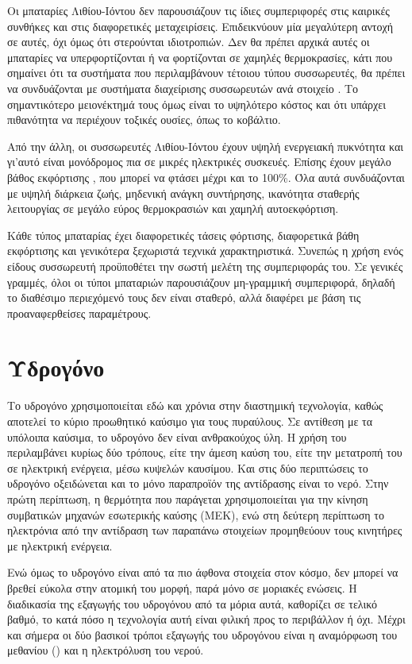 \documentclass[12pt]{report}
\begin{document}
Οι μπαταρίες Λιθίου-Ιόντου δεν παρουσιάζουν τις ίδιες συμπεριφορές στις καιρικές συνθήκες και στις διαφορετικές μεταχειρίσεις. Επιδεικνύουν μία μεγαλύτερη αντοχή σε αυτές, όχι όμως ότι στερούνται ιδιοτροπιών. 
Δεν θα πρέπει αρχικά αυτές οι μπαταρίες να υπερφορτίζονται ή να φορτίζονται σε χαμηλές θερμοκρασίες, κάτι που σημαίνει ότι τα συστήματα που περιλαμβάνουν τέτοιου τύπου συσσωρευτές, θα πρέπει να συνδυάζονται με συστήματα
διαχείρισης συσσωρευτών ανά στοιχείο {}. Το σημαντικότερο μειονέκτημά τους όμως είναι το υψηλότερο κόστος και ότι υπάρχει πιθανότητα να περιέχουν τοξικές ουσίες, όπως το κοβάλτιο.

Από την άλλη, οι συσσωρευτές Λιθίου-Ιόντου έχουν υψηλή ενεργειακή πυκνότητα και γι'αυτό είναι μονόδρομος πια σε μικρές ηλεκτρικές συσκευές. Επίσης έχουν μεγάλο βάθος εκφόρτισης {}, που μπορεί
να φτάσει μέχρι και το 100\%. Όλα αυτά συνδυάζονται με υψηλή διάρκεια ζωής, μηδενική ανάγκη συντήρησης, ικανότητα σταθερής λειτουργίας σε μεγάλο εύρος θερμοκρασιών και χαμηλή αυτοεκφόρτιση.

Κάθε τύπος μπαταρίας έχει διαφορετικές τάσεις φόρτισης, διαφορετικά βάθη εκφόρτισης και γενικότερα ξεχωριστά τεχνικά χαρακτηριστικά. Συνεπώς η χρήση ενός είδους συσσωρευτή προϋποθέτει την σωστή μελέτη της συμπεριφοράς του.
Σε γενικές γραμμές, όλοι οι τύποι μπαταριών παρουσιάζουν μη-γραμμική συμπεριφορά, δηλαδή το διαθέσιμο περιεχόμενό τους δεν είναι σταθερό, αλλά διαφέρει με βάση τις προαναφερθείσες παραμέτρους.

\section{Υδρογόνο}
\label{chap:hydrogen} 
Το υδρογόνο χρησιμοποιείται εδώ και χρόνια στην διαστημική τεχνολογία, καθώς αποτελεί το κύριο προωθητικό καύσιμο για τους πυραύλους. Σε αντίθεση με τα υπόλοιπα καύσιμα, το υδρογόνο δεν είναι ανθρακούχος ύλη. 
Η χρήση του περιλαμβάνει κυρίως δύο τρόπους, είτε την άμεση καύση του, 
είτε την μετατροπή του σε ηλεκτρική ενέργεια, μέσω κυψελών καυσίμου. Και στις δύο περιπτώσεις το υδρογόνο οξειδώνεται και το μόνο παραπροϊόν της αντίδρασης είναι το νερό. 
Στην πρώτη περίπτωση, η θερμότητα που παράγεται χρησιμοποιείται για την κίνηση συμβατικών μηχανών εσωτερικής καύσης (ΜΕΚ), ενώ στη δεύτερη περίπτωση το ηλεκτρόνια από την αντίδραση των παραπάνω στοιχείων 
προμηθεύουν τους κινητήρες με ηλεκτρική ενέργεια.

Ενώ όμως το υδρογόνο είναι από τα πιο άφθονα στοιχεία στον κόσμο, δεν μπορεί να βρεθεί εύκολα στην ατομική του μορφή, παρά μόνο σε μοριακές ενώσεις. Η διαδικασία της εξαγωγής του υδρογόνου από τα μόρια αυτά, 
καθορίζει σε τελικό βαθμό, το κατά πόσο η τεχνολογία αυτή είναι φιλική προς το περιβάλλον ή όχι. Μέχρι και σήμερα οι δύο βασικοί τρόποι εξαγωγής του υδρογόνου είναι η αναμόρφωση του μεθανίου ({}) και η
ηλεκτρόλυση του νερού.
\end{document}
